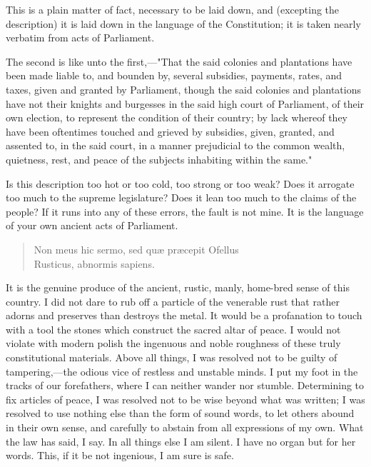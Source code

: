 This is a plain matter of fact, necessary to be laid down, and (excepting the description) it is laid down in the language of the Constitution; it is taken nearly verbatim from acts of Parliament.

The second is like unto the first,—"That the said colonies and plantations have been made liable to, and bounden by, several subsidies, payments, rates, and taxes, given and granted by Parliament, though the said colonies and plantations have not their knights and burgesses in the said high court of Parliament, of their own election, to represent the condition of their country; by lack whereof they have been oftentimes touched and grieved by subsidies, given, granted, and assented to, in the said court, in a manner prejudicial to the common wealth, quietness, rest, and peace of the subjects inhabiting within the same."

Is this description too hot or too cold, too strong or too weak? Does it arrogate too much to the supreme legislature? Does it lean too much to the claims of the people? If it runs into any of these errors, the fault is not mine. It is the language of your own ancient acts of Parliament.

\begin{verse}
Non meus hic sermo, sed quæ præcepit Ofellus \\
Rusticus, abnormis sapiens.
\end{verse}

It is the genuine produce of the ancient, rustic, manly, home-bred sense of this country. I did not dare to rub off a particle of the venerable rust that rather adorns and preserves than destroys the metal. It would be a profanation to touch with a tool the stones which construct the sacred altar of peace. I would not violate with modern polish the ingenuous and noble roughness of these truly constitutional materials. Above all things, I was resolved not to be guilty of tampering,—the odious vice of restless and unstable minds. I put my foot in the tracks of our forefathers, where I can neither wander nor stumble. Determining to fix articles of peace, I was resolved not to be wise beyond what was written; I was resolved to use nothing else than the form of sound words, to let others abound in their own sense, and carefully to abstain from all expressions of my own. What the law has said, I say. In all things else I am silent. I have no organ but for her words. This, if it be not ingenious, I am sure is safe.

